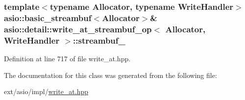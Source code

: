 \subsubsection[{streambuf\+\_\+}]{\setlength{\rightskip}{0pt plus 5cm}template$<$typename Allocator, typename Write\+Handler$>$ {\bf asio\+::basic\+\_\+streambuf}$<$Allocator$>$\& {\bf asio\+::detail\+::write\+\_\+at\+\_\+streambuf\+\_\+op}$<$ Allocator, Write\+Handler $>$\+::streambuf\+\_\+}\label{classasio_1_1detail_1_1write__at__streambuf__op_a888b8cc4dc6b6b5ad8c6f08431807f59}


Definition at line 717 of file write\+\_\+at.\+hpp.



The documentation for this class was generated from the following file\+:\begin{DoxyCompactItemize}
\item 
ext/asio/impl/\hyperlink{impl_2write__at_8hpp}{write\+\_\+at.\+hpp}\end{DoxyCompactItemize}
